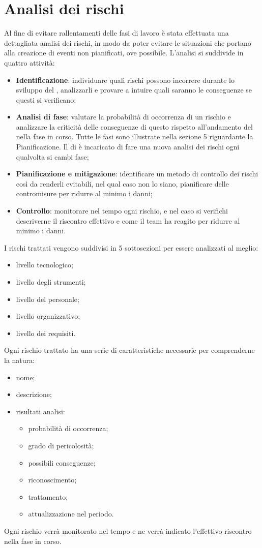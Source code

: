 \documentclass[PianoDiProgetto.tex]{subfiles}
\begin{document}
\section{Analisi dei rischi}
Al fine di evitare rallentamenti delle fasi di lavoro è stata effettuata una dettagliata analisi dei rischi, in modo da poter evitare le situazioni che portano alla creazione di eventi non pianificati, ove possibile. L'analisi si suddivide in quattro attività:
	\begin{itemize}
		\item \textbf{Identificazione}: individuare quali rischi possono incorrere durante lo sviluppo del , analizzarli e provare a intuire quali saranno le conseguenze se questi si verificano;
		\item \textbf{Analisi di fase}: valutare la probabilità di occorrenza di un rischio e analizzare la criticità delle conseguenze di questo rispetto all'andamento del  nella fase in corso. Tutte le fasi sono illustrate nella sezione 5 riguardante la Pianificazione. Il \RESP{} di  è incaricato  di fare una nuova analisi dei rischi ogni qualvolta si cambi fase;
		\item \textbf{Pianificazione e mitigazione}: identificare un metodo di controllo dei rischi così da renderli evitabili, nel qual caso non lo siano, pianificare delle contromisure per ridurre al minimo i danni; 
		\item \textbf{Controllo}: monitorare nel tempo ogni rischio, e nel caso si verifichi descriverne il riscontro effettivo e come il team ha reagito per ridurre al minimo i danni. 
	\end{itemize}
I rischi trattati vengono suddivisi in 5 sottosezioni per essere analizzati al meglio:
	\begin{itemize}
		\item livello tecnologico;
		\item livello degli strumenti;
		\item livello del personale;
		\item livello organizzativo;
		\item livello dei requisiti.
	\end{itemize}
Ogni rischio trattato ha una serie di caratteristiche necessarie per comprenderne la natura:
	\begin{itemize}
		\item nome;
		\item descrizione;
		\item risultati analisi:
			\begin{itemize}
				\item probabilità di occorrenza;
				\item grado di pericolosità;
				\item possibili conseguenze;
				\item riconoscimento;
				\item trattamento;
				\item attualizzazione nel periodo.
			\end{itemize}
	\end{itemize}
Ogni rischio verrà monitorato nel tempo e ne verrà indicato l'effettivo riscontro nella fase in corso.
\end{document}
